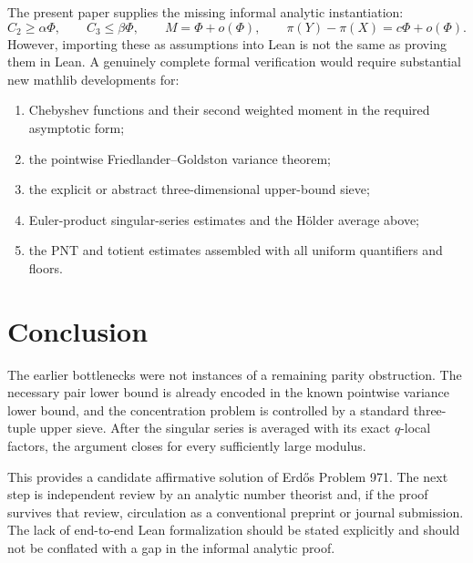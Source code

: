 \documentclass[11pt]{article}
\theoremstyle{definition}
\theoremstyle{remark}
\newcommand{\1}{\mathbf 1}
\begin{document}
The present paper supplies the missing informal analytic instantiation:
\[
 C_2\ge\alpha\Phi,\qquad C_3\le\beta\Phi,
 \qquad M=\Phi+o(\Phi),
 \qquad \pi(Y)-\pi(X)=c\Phi+o(\Phi).
\]
However, importing these as assumptions into Lean is not the same as proving them in Lean.  A genuinely complete formal verification would require substantial new mathlib developments for:

\begin{enumerate}[leftmargin=2em]
 \item Chebyshev functions and their second weighted moment in the required asymptotic form;
 \item the pointwise Friedlander--Goldston variance theorem;
 \item the explicit or abstract three-dimensional upper-bound sieve;
 \item Euler-product singular-series estimates and the H\"older average above;
 \item the PNT and totient estimates assembled with all uniform quantifiers and floors.
\end{enumerate}



\section*{Conclusion}

The earlier bottlenecks were not instances of a remaining parity obstruction.  The necessary pair lower bound is already encoded in the known pointwise variance lower bound, and the concentration problem is controlled by a standard three-tuple upper sieve.  After the singular series is averaged with its exact $q$-local factors, the argument closes for every sufficiently large modulus.

This provides a candidate affirmative solution of Erd\H{o}s Problem 971.  The next step is independent review by an analytic number theorist and, if the proof survives that review, circulation as a conventional preprint or journal submission.  The lack of end-to-end Lean formalization should be stated explicitly and should not be conflated with a gap in the informal analytic proof.
\end{document}
